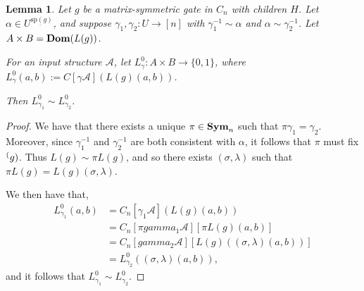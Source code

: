 \documentclass[12pt]{report}
\newtheorem{lem}[thm]{Lemma} \newtheorem{prop}[thm]{Proposition}
\newcommand{\sym}{\text{\textbf{Sym}}}
\newcommand{\dom}{\text{\textbf{Dom}}}
\newcommand{\consp}{\text{sp}}
\newcommand{\EV}{\text{EV}}
\begin{document}
\begin{lem}
  Let $g$ be a matrix-symmetric gate in $C_n$ with children $H$. Let $\alpha \in
  U^{\underbar{\consp(g)}}$, and suppose $\gamma_1, \gamma_2: U \rightarrow [n]$
  with $\gamma^{-1}_1 \sim \alpha$ and $\alpha \sim \gamma^{-1}_2$. Let $A
  \times B = \dom (L(g))$.

  For an input structure $\mathcal{A}$, let $L^0_\gamma: A \times B \rightarrow
  \{0,1\}$, where $L^0_\gamma (a,b):= C[\gamma \mathcal{A}] (L(g)(a,b))$.

  Then $L^0_{\gamma_1} \sim L^0_{\gamma_2}$.
\end{lem}

\begin{proof}
  We have that there exists a unique $\pi \in \sym_n$ such that $\pi \gamma_1 =
  \gamma_2$. Moreover, since $\gamma^{-1}_1$ and $\gamma^{-1}_2$ are both
  consistent with $\alpha$, it follows that $\pi$ must fix $\sp(g)$. Thus $L(g)
  \sim \pi L(g)$, and so there exists $(\sigma, \lambda)$ such that $\pi L(g) =
  L(g) (\sigma, \lambda)$.

  We then have that,
  \begin{align*}
    L^0_{\gamma_1} (a,b) &= C_n[\gamma_1 \mathcal{A}](L(g)(a,b))\\
                         & = C_n[\pi gamma_1 \mathcal{A}][\pi L(g)(a,b)] \\
                         & = C_n[gamma_2 \mathcal{A}][L(g)((\sigma, \lambda)(a,b))]\\
                         & = L^0_{\gamma_2} ((\sigma, \lambda) (a,b)),
  \end{align*}
  and it follows that $L^0_{\gamma_1} \sim L^0_{\gamma_2}$.

\end{proof}

%  
\end{document}
